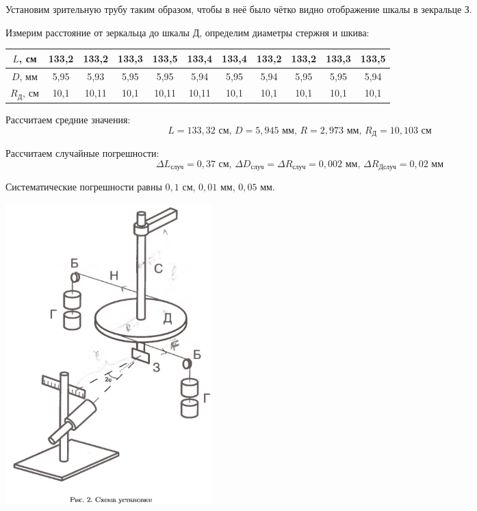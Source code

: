 \documentclass[a4paper, 12pt]{article} %
\begin{document}
Установим зрительную трубу таким образом, чтобы в неё было чётко видно отображение шкалы в зекральце З. 

Измерим расстояние от зеркальца до шкалы Д, определим диаметры стержня и шкива:
\begin{center}
\begin{tabular}{|c|c|c|c|c|c|c|c|c|c|c|}
\hline 
$L$, см & 133,2 & 133,2 & 133,3 & 133,5 & 133,4 & 133,4 & 133,2 & 133,2 & 133,3 & 133,5 \\ 
\hline 
$D$, мм & 5,95 & 5,93 & 5,95 & 5,95 & 5,94 & 5,95 & 5,94 & 5,95 & 5,95 & 5,94 \\ 
\hline 
$R_{\text{Д}}$, см & 10,1 & 10,11 & 10,1 & 10,11 & 10,11 & 10,1 & 10,1 & 10,1 & 10,1 & 10,1 \\ 
\hline 
\end{tabular}
\end{center} 

Рассчитаем средние значения:
\[L = 133,32\text{ см, }D = 5,945\text{ мм, }R = 2,973\text{ мм, }R_{\text{Д}} = 10,103\text{ см}\]

Рассчитаем случайные погрешности:
\[\Delta L_{\text{случ}} = 0,37\text{ см, }\Delta D_{\text{случ}} = \Delta R_{\text{случ}} = 0,002\text{ мм, }\Delta R_{\text{Дслуч}} = 0,02\text{ мм}\]

Систематические погрешности равны $0,1$ см, $0,01$ мм, $0,05$ мм.

\begin{center}
    {\includegraphics[width=8cm]{2}}
\end{center} 
\end{document}
